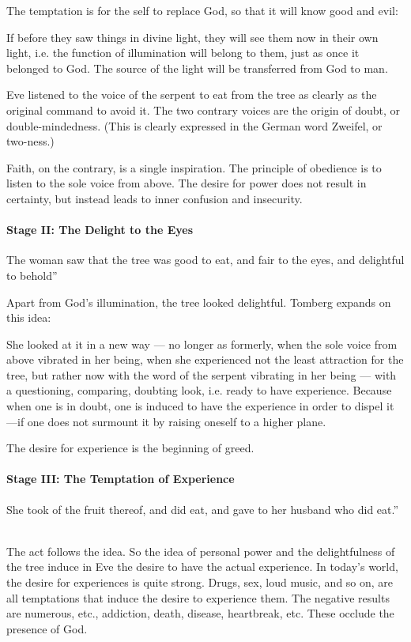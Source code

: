 The temptation is for the self to replace God, so that it will know good and evil:

\begin{quotex}
If before they saw things in divine light, they will see them now in their own light, i.e. the function of illumination
will belong to them, just as once it belonged to God. The source of the light will be transferred from God to man. 

\end{quotex}
Eve listened to the voice of the serpent to eat from the tree as clearly as the original command to avoid it. The two
contrary voices are the origin of doubt, or double-mindedness. (This is clearly expressed in the German word Zweifel,
or two-ness.)

Faith, on the contrary, is a single inspiration. The principle of obedience is to listen to the sole voice from above.
The desire for power does not result in certainty, but instead leads to inner confusion and insecurity.

\paragraph{Stage II: The Delight to the Eyes}
\begin{quotex}
The woman saw that the tree was good to eat, and fair to the eyes, and delightful to behold”  

\end{quotex}
Apart from God's illumination, the tree looked delightful. Tomberg expands on this idea:

\begin{quotex}
She looked at it in a new way — no longer as formerly, when the sole voice from above vibrated in her being,
when she experienced not the least attraction for the tree, but rather now with the word of the serpent vibrating in
her being — with a questioning, comparing, doubting look, i.e. ready to have experience. Because when one
is in doubt, one is induced to have the experience in order to dispel it —if one does not surmount it by
raising oneself to a higher plane. 

\end{quotex}
The desire for experience is the beginning of greed.

\paragraph{Stage III: The Temptation of Experience}
\begin{quotex}
She took of the fruit thereof, and did eat, and gave to her husband who did eat.”   

\end{quotex}
The act follows the idea. So the idea of personal power and the delightfulness of the tree induce in Eve the desire to
have the actual experience. In today's world, the desire for experiences is quite strong. Drugs, sex, loud
music, and so on, are all temptations that induce the desire to experience them. The negative results are numerous,
etc., addiction, death, disease, heartbreak, etc. These occlude the presence of God.

